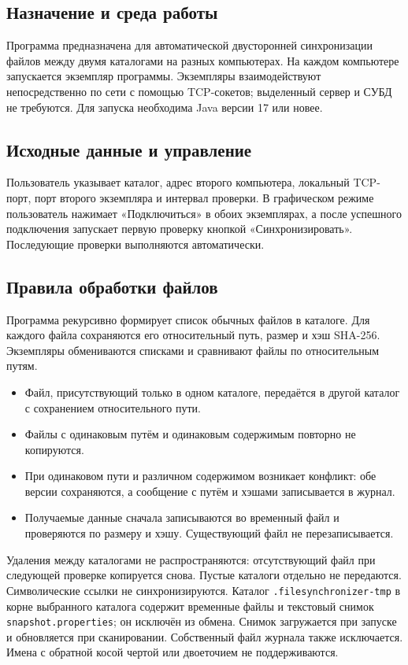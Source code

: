 \subsection{Назначение и среда работы}

Программа предназначена для автоматической двусторонней синхронизации файлов между двумя каталогами на разных компьютерах. На каждом компьютере запускается экземпляр программы. Экземпляры взаимодействуют непосредственно по сети с помощью TCP-сокетов; выделенный сервер и СУБД не требуются. Для запуска необходима Java версии 17 или новее.

\subsection{Исходные данные и управление}

Пользователь указывает каталог, адрес второго компьютера, локальный TCP-порт, порт второго экземпляра и интервал проверки. В графическом режиме пользователь нажимает «Подключиться» в обоих экземплярах, а после успешного подключения запускает первую проверку кнопкой «Синхронизировать». Последующие проверки выполняются автоматически.

\subsection{Правила обработки файлов}

Программа рекурсивно формирует список обычных файлов в каталоге. Для каждого файла сохраняются его относительный путь, размер и хэш SHA-256. Экземпляры обмениваются списками и сравнивают файлы по относительным путям.

\begin{itemize}
  \item Файл, присутствующий только в одном каталоге, передаётся в другой каталог с сохранением относительного пути.
  \item Файлы с одинаковым путём и одинаковым содержимым повторно не копируются.
  \item При одинаковом пути и различном содержимом возникает конфликт: обе версии сохраняются, а сообщение с путём и хэшами записывается в журнал.
  \item Получаемые данные сначала записываются во временный файл и проверяются по размеру и хэшу. Существующий файл не перезаписывается.
\end{itemize}

Удаления между каталогами не распространяются: отсутствующий файл при следующей проверке копируется снова. Пустые каталоги отдельно не передаются. Символические ссылки не синхронизируются. Каталог \texttt{.filesynchronizer-tmp} в корне выбранного каталога содержит временные файлы и текстовый снимок \texttt{snapshot.properties}; он исключён из обмена. Снимок загружается при запуске и обновляется при сканировании. Собственный файл журнала также исключается. Имена с обратной косой чертой или двоеточием не поддерживаются.

